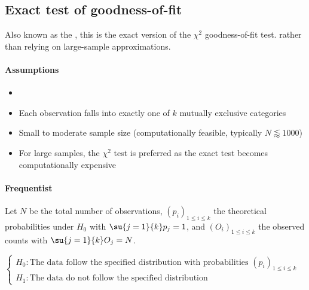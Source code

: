 \subsection{Exact test of goodness-of-fit}
Also known as the , this is the exact version of the $\chi^2$ goodness-of-fit test.
rather than relying on large-sample approximations.

\paragraph{Assumptions}
\begin{itemize}
    \item {}
    \item Each observation falls into exactly one of $k$ mutually exclusive categories
    \item Small to moderate sample size (computationally feasible, typically $N \lessapprox 1000$)
    \item For large samples, the $\chi^2$ test is preferred as the exact test becomes computationally expensive
\end{itemize}

\paragraph{Frequentist}
Let $N$ be the total number of observations, $\left(p_i\right)_{1\leq i\leq k}$ the theoretical probabilities
under $H_0$ with $\su{j=1}{k}p_j = 1$, and $\left(O_i\right)_{1\leq i\leq k}$ the observed counts with $\su{j=1}{k}O_j = N$.

$\begin{cases}
    H_{0}: \text{The data follow the specified distribution with probabilities } \left(p_i\right)_{1\leq i\leq k}\\
    H_{1}: \text{The data do not follow the specified distribution}
\end{cases}$

